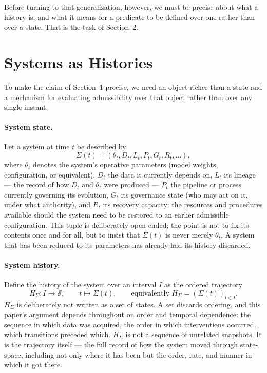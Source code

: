 \documentclass[11pt]{article}
\begin{document}
Before turning to that generalization, however, we must be precise about what a history is, and what it means for a predicate to be defined over one rather than over a state. That is the task of Section~2.

\section{Systems as Histories}

To make the claim of Section~1 precise, we need an object richer than a state and a mechanism for evaluating admissibility over that object rather than over any single instant.

\paragraph{System state.} Let a system at time $t$ be described by
\begin{equation}
\Sigma(t) = (\theta_t, D_t, L_t, P_t, G_t, R_t, \ldots),
\end{equation}
where $\theta_t$ denotes the system's operative parameters (model weights, configuration, or equivalent), $D_t$ the data it currently depends on, $L_t$ its lineage --- the record of how $D_t$ and $\theta_t$ were produced --- $P_t$ the pipeline or process currently governing its evolution, $G_t$ its governance state (who may act on it, under what authority), and $R_t$ its recovery capacity: the resources and procedures available should the system need to be restored to an earlier admissible configuration. This tuple is deliberately open-ended; the point is not to fix its contents once and for all, but to insist that $\Sigma(t)$ is never merely $\theta_t$. A system that has been reduced to its parameters has already had its history discarded.

\paragraph{System history.} Define the history of the system over an interval $I$ as the ordered trajectory
\begin{equation}
H_\Sigma : I \to \mathcal{S}, \qquad t \mapsto \Sigma(t), \qquad \text{equivalently } H_\Sigma = (\Sigma(t))_{t \in I}.
\end{equation}
$H_\Sigma$ is deliberately not written as a set of states. A set discards ordering, and this paper's argument depends throughout on order and temporal dependence: the sequence in which data was acquired, the order in which interventions occurred, which transitions preceded which. $H_\Sigma$ is not a sequence of unrelated snapshots. It is the trajectory itself --- the full record of how the system moved through state-space, including not only where it has been but the order, rate, and manner in which it got there.
\end{document}
